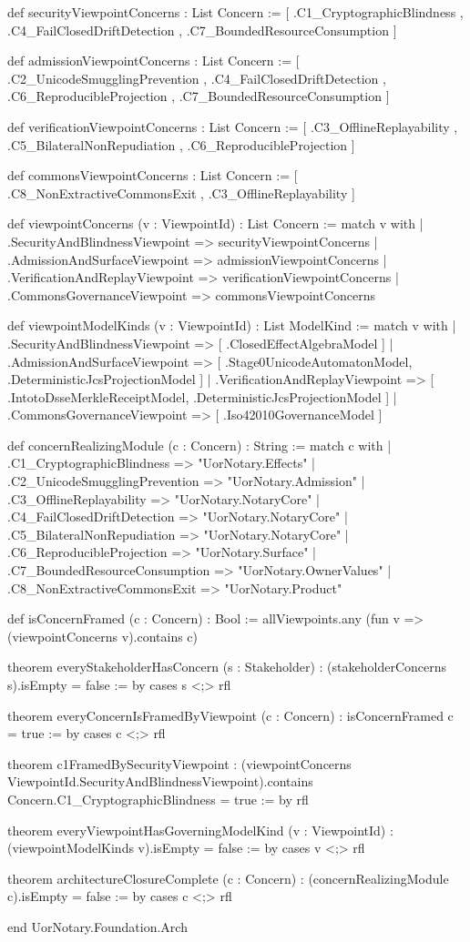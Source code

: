 \documentclass[12pt]{lexlean}
\begin{document}
\begin{lean}
def securityViewpointConcerns : List Concern :=
  [ .C1_CryptographicBlindness
  , .C4_FailClosedDriftDetection
  , .C7_BoundedResourceConsumption
  ]

def admissionViewpointConcerns : List Concern :=
  [ .C2_UnicodeSmugglingPrevention
  , .C4_FailClosedDriftDetection
  , .C6_ReproducibleProjection
  , .C7_BoundedResourceConsumption
  ]

def verificationViewpointConcerns : List Concern :=
  [ .C3_OfflineReplayability
  , .C5_BilateralNonRepudiation
  , .C6_ReproducibleProjection
  ]

def commonsViewpointConcerns : List Concern :=
  [ .C8_NonExtractiveCommonsExit
  , .C3_OfflineReplayability
  ]

def viewpointConcerns (v : ViewpointId) : List Concern :=
  match v with
  | .SecurityAndBlindnessViewpoint  => securityViewpointConcerns
  | .AdmissionAndSurfaceViewpoint   => admissionViewpointConcerns
  | .VerificationAndReplayViewpoint => verificationViewpointConcerns
  | .CommonsGovernanceViewpoint     => commonsViewpointConcerns

def viewpointModelKinds (v : ViewpointId) : List ModelKind :=
  match v with
  | .SecurityAndBlindnessViewpoint  => [ .ClosedEffectAlgebraModel ]
  | .AdmissionAndSurfaceViewpoint   => [ .Stage0UnicodeAutomatonModel, .DeterministicJcsProjectionModel ]
  | .VerificationAndReplayViewpoint => [ .IntotoDsseMerkleReceiptModel, .DeterministicJcsProjectionModel ]
  | .CommonsGovernanceViewpoint     => [ .Iso42010GovernanceModel ]

def concernRealizingModule (c : Concern) : String :=
  match c with
  | .C1_CryptographicBlindness     => "UorNotary.Effects"
  | .C2_UnicodeSmugglingPrevention => "UorNotary.Admission"
  | .C3_OfflineReplayability       => "UorNotary.NotaryCore"
  | .C4_FailClosedDriftDetection   => "UorNotary.NotaryCore"
  | .C5_BilateralNonRepudiation    => "UorNotary.NotaryCore"
  | .C6_ReproducibleProjection     => "UorNotary.Surface"
  | .C7_BoundedResourceConsumption => "UorNotary.OwnerValues"
  | .C8_NonExtractiveCommonsExit   => "UorNotary.Product"

def isConcernFramed (c : Concern) : Bool :=
  allViewpoints.any (fun v => (viewpointConcerns v).contains c)

theorem everyStakeholderHasConcern (s : Stakeholder) :
    (stakeholderConcerns s).isEmpty = false := by
  cases s <;> rfl

theorem everyConcernIsFramedByViewpoint (c : Concern) :
    isConcernFramed c = true := by
  cases c <;> rfl

theorem c1FramedBySecurityViewpoint :
    (viewpointConcerns ViewpointId.SecurityAndBlindnessViewpoint).contains
      Concern.C1_CryptographicBlindness = true := by
  rfl

theorem everyViewpointHasGoverningModelKind (v : ViewpointId) :
    (viewpointModelKinds v).isEmpty = false := by
  cases v <;> rfl

theorem architectureClosureComplete (c : Concern) :
    (concernRealizingModule c).isEmpty = false := by
  cases c <;> rfl

end UorNotary.Foundation.Arch
\end{lean}
\end{document}
